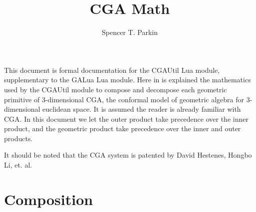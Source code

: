 \documentclass[12pt]{article}
\title{CGA Math}
\author{Spencer T. Parkin}
\begin{document}
\maketitle

This document is formal documentation for the CGAUtil Lua module,
supplementary to the GALua Lua module.  Here in is explained the
mathematics used by the CGAUtil module to compose and decompose
each geometric primitive of 3-dimensional CGA, the conformal model of geometric algebra
for 3-dimensional euclidean space.  It is assumed the reader is already
familiar with CGA.  In this document we let the outer product take precedence
over the inner product, and the geometric product take precedence over
the inner and outer products.

It should be noted that the CGA system is patented by David Hestenes, Hongbo Li, et. al.

\section{Composition}
\end{document}
